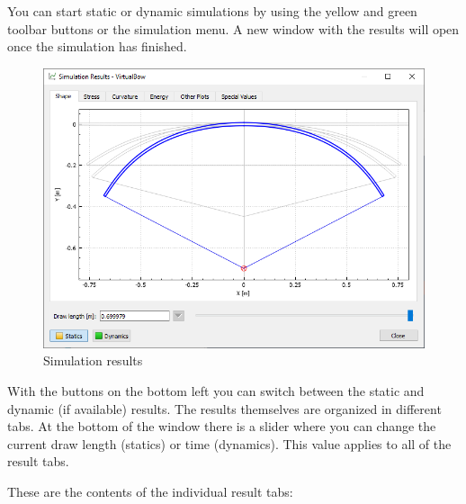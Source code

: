 \documentclass[12pt]{article}
\begin{document}
You can start static or dynamic simulations by using the yellow and green toolbar buttons or the simulation menu.
A new window with the results will open once the simulation has finished.

\begin{figure}[H]
\centering
\includegraphics[width=\textwidth]{figures/screenshots/output/result-window}
\caption{Simulation results}
\label{fig:result-window}
\end{figure}

With the buttons on the bottom left you can switch between the static and dynamic (if available) results.
The results themselves are organized in different tabs.
At the bottom of the window there is a slider where you can change the current draw length (statics) or time (dynamics).
This value applies to all of the result tabs.

\newpage
These are the contents of the individual result tabs:
\end{document}
